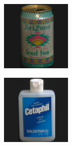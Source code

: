 \begin{figure}[htbp]
    \begin{subfigure}{80pt}
        \centering
    \includegraphics[width=\textwidth]{figures/coil_original/7.png}
    \caption{}
	\end{subfigure}
	\begin{subfigure}{80pt}
        \centering
    \includegraphics[width=\textwidth]{figures/coil_original/13.png}

\end{subfigure}
\end{figure}
